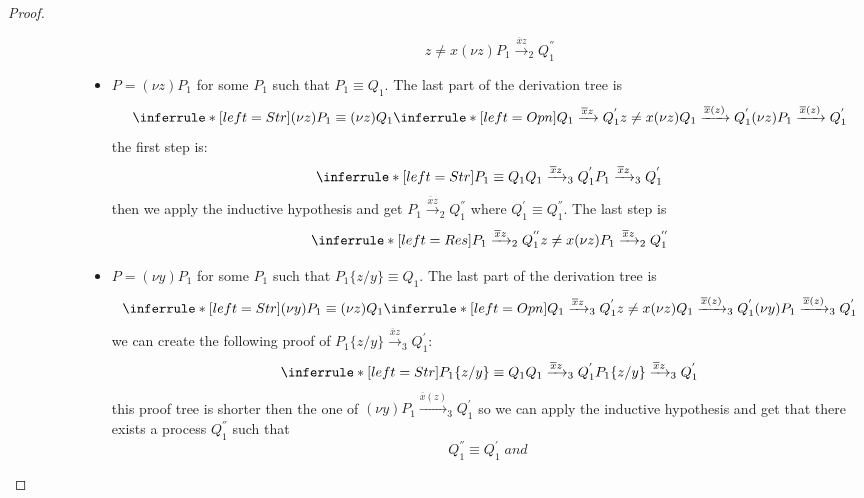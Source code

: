 \begin{theorem}
\begin{proof}
\begin{description}
\begin{description}
\begin{itemize}
\[{			      z\neq x
			  }{
			    (\nu z)P_{1}\xrightarrow{\overline{x}z}_{2}Q_{1}^{''}
			  }
			\]
		      \item
			$P=(\nu z) P_{1}$ for some $P_{1}$ such that $P_{1}\equiv Q_{1}$. The last part of the derivation tree is 
			\[
			  \inferrule* [left=Str]{
			      (\nu z) P_{1}\equiv (\nu z) Q_{1}
			    \\
			      \inferrule* [left=Opn]{
				  Q_{1} \xrightarrow{\overline{x}z} Q_{1}^{'}
				\\
				  z\neq x
			      }{
				(\nu z) Q_{1} \xrightarrow{\overline{x}(z)} Q_{1}^{'}
			      }
			  }{
			    (\nu z) P_{1} \xrightarrow{\overline{x}(z)} Q_{1}^{'}
			  }
			\]
			the first step is:
			\[
			      \inferrule* [left=Str]{
				  P_{1}\equiv Q_{1}
				\\
				  Q_{1}\xrightarrow{\overline{x}z}_{3}Q_{1}^{'}
			      }{
				P_{1}\xrightarrow{\overline{x}z}_{3}Q_{1}^{'}
			      }
			\]
			then we apply the inductive hypothesis and get $P_{1}\xrightarrow{\overline{x}z}_{2}Q_{1}^{''}$ where $Q_{1}^{'}\equiv Q_{1}^{''}$. The last step is 
			\[
			  \inferrule* [left=Res]{
			      P_{1}\xrightarrow{\overline{x}z}_{2}Q_{1}^{''}
			    \\
			      z\neq x
			  }{
			    (\nu z)P_{1}\xrightarrow{\overline{x}z}_{2}Q_{1}^{''}
			  }
			\]
		      \item
			$P=(\nu y) P_{1}$ for some $P_{1}$ such that $P_{1}\{z/y\}\equiv Q_{1}$. The last part of the derivation tree is 
			\[
			  \inferrule* [left=Str]{
			      (\nu y) P_{1}\equiv (\nu z) Q_{1}
			    \\
			      \inferrule* [left=Opn]{
				  Q_{1} \xrightarrow{\overline{x}z}_{3} Q_{1}^{'}
				\\
				  z\neq x
			      }{
				(\nu z) Q_{1} \xrightarrow{\overline{x}(z)}_{3} Q_{1}^{'}
			      }
			  }{
			    (\nu y) P_{1} \xrightarrow{\overline{x}(z)}_{3} Q_{1}^{'}
			  }
			\]
			we can create the following proof of $P_{1}\{z/y\} \xrightarrow{\overline{x}z}_{3} Q_{1}^{'}$:
			\[
			  \inferrule* [left=Str]{
			      P_{1}\{z/y\}\equiv Q_{1}
			    \\
			      Q_{1} 
				\xrightarrow{\overline{x}z}_{3} 
				  Q_{1}^{'}
			  }{
			    P_{1}\{z/y\} 
			      \xrightarrow{\overline{x}z}_{3} 
				Q_{1}^{'}
			  }
			\]
			this proof tree is shorter then the one of $(\nu y) P_{1} \xrightarrow{\overline{x}(z)}_{3} Q_{1}^{'}$ so we can apply the inductive hypothesis and get that there exists a process $Q_{1}^{''}$ such that
			\[
			  Q_{1}^{''}\equiv Q_{1}^{'}\; and\;
\]
\end{itemize}
\end{description}
\end{description}
\end{proof}
\end{theorem}
